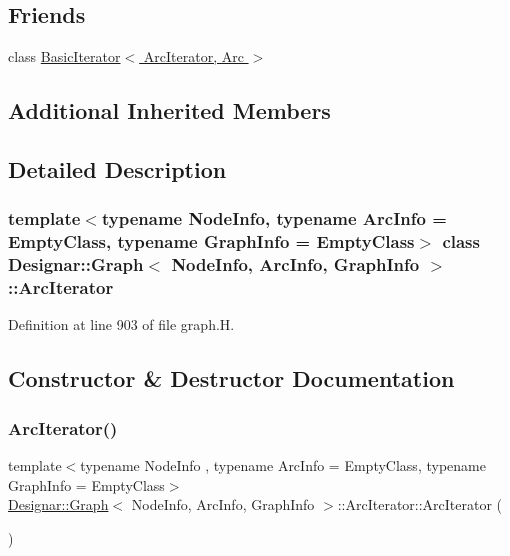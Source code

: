 \subsection*{Friends}
\begin{DoxyCompactItemize}
\item 
class \hyperlink{class_designar_1_1_graph_1_1_arc_iterator_a530ad7c7218fa9b74a5cce004d0e3a1c}{Basic\+Iterator$<$ Arc\+Iterator, Arc $>$}
\end{DoxyCompactItemize}
\subsection*{Additional Inherited Members}


\subsection{Detailed Description}
\subsubsection*{template$<$typename Node\+Info, typename Arc\+Info = Empty\+Class, typename Graph\+Info = Empty\+Class$>$\newline
class Designar\+::\+Graph$<$ Node\+Info, Arc\+Info, Graph\+Info $>$\+::\+Arc\+Iterator}



Definition at line 903 of file graph.\+H.



\subsection{Constructor \& Destructor Documentation}
\mbox{\label{class_designar_1_1_graph_1_1_arc_iterator_a642cf08854577ea29ba520ee882c9d54}} 
\subsubsection{\texorpdfstring{Arc\+Iterator()}{ArcIterator()}\hspace{0.1cm}{\footnotesize\ttfamily [1/5]}}
{\footnotesize\ttfamily template$<$typename Node\+Info , typename Arc\+Info  = Empty\+Class, typename Graph\+Info  = Empty\+Class$>$ \\
\hyperlink{class_designar_1_1_graph}{Designar\+::\+Graph}$<$ Node\+Info, Arc\+Info, Graph\+Info $>$\+::Arc\+Iterator\+::\+Arc\+Iterator (\begin{DoxyParamCaption}{ }\end{DoxyParamCaption})\hspace{0.3cm}{\ttfamily [inline]}}



